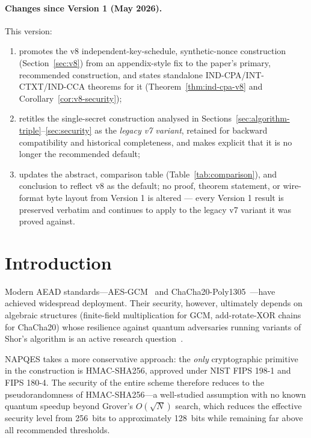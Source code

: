 \documentclass[11pt,a4paper]{article}
\begin{document}
\paragraph{Changes since Version 1 (May 2026).} This version:
\begin{enumerate}
  \item promotes the v8 independent-key-schedule, synthetic-nonce
        construction (Section~\ref{sec:v8}) from an appendix-style fix to
        the paper's primary, recommended construction, and states
        standalone IND-CPA/INT-CTXT/IND-CCA theorems for it
        (Theorem~\ref{thm:ind-cpa-v8} and Corollary~\ref{cor:v8-security});
  \item retitles the single-secret construction analysed in
        Sections~\ref{sec:algorithm-triple}--\ref{sec:security} as the
        \emph{legacy v7 variant}, retained for backward compatibility and
        historical completeness, and makes explicit that it is no longer
        the recommended default;
  \item updates the abstract, comparison table
        (Table~\ref{tab:comparison}), and conclusion to reflect v8 as the
        default; no proof, theorem statement, or wire-format byte layout
        from Version 1 is altered --- every Version 1 result is preserved
        verbatim and continues to apply to the legacy v7 variant it was
        proved against.
\end{enumerate}

\tableofcontents
\clearpage

\section{Introduction}
\label{sec:intro}

Modern AEAD standards—AES-GCM~\cite{nist-gcm} and
ChaCha20-Poly1305~\cite{rfc7539}—have achieved widespread deployment.
Their security, however, ultimately depends on algebraic structures
(finite-field multiplication for GCM, add-rotate-XOR chains for ChaCha20)
whose resilience against quantum adversaries running variants of Shor's
algorithm is an active research question~\cite{nistpq2022}.

NAPQES takes a more conservative approach: the \emph{only} cryptographic
primitive in the construction is HMAC-SHA256, approved under NIST FIPS 198-1
and FIPS 180-4.  The security of the entire scheme therefore reduces to the
pseudorandomness of HMAC-SHA256—a well-studied assumption with no known
quantum speedup beyond Grover's $O(\sqrt{N})$ search, which reduces the
effective security level from 256~bits to approximately 128~bits while
remaining far above all recommended thresholds.
\end{document}
